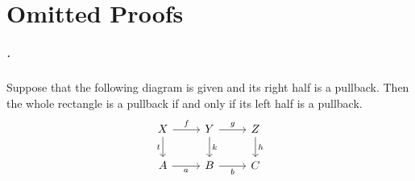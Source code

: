 \chapter{Omitted Proofs}

\paragraph{.}
    Suppose that the following diagram is given and its right half is a pullback. Then the whole rectangle is a pullback if and only if its left half is a pullback.
    \[
        \begin{tikzcd}
            X \arrow[r, "f"] \arrow[d, "t"swap] & Y \arrow[r, "g"] \arrow[d, "k"] & Z \arrow[d, "h"] \\
            A \arrow[r, "a"swap] & B \arrow[r, "b"swap] & C
        \end{tikzcd}
    \]
